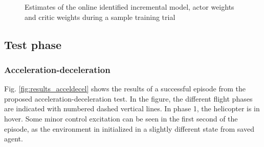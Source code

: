 \begin{figure}[htb]
    \centering
    \caption{Estimates of the online identified incremental model, actor weights and critic weights during a sample training trial}
    \label{fig:training_weights}
\end{figure}

\subsection{Test phase} \label{ssec:results:test}
\subsubsection{Acceleration-deceleration}
Fig. \ref{fig:results_acceldecel} shows the results of a successful episode from the proposed acceleration-deceleration test. In the figure, the different flight phases are indicated with numbered dashed vertical lines. 
In phase 1, the helicopter is in hover. Some minor control excitation can be seen in the first second of the episode, as the environment in initialized in a slightly different state from saved agent. 

